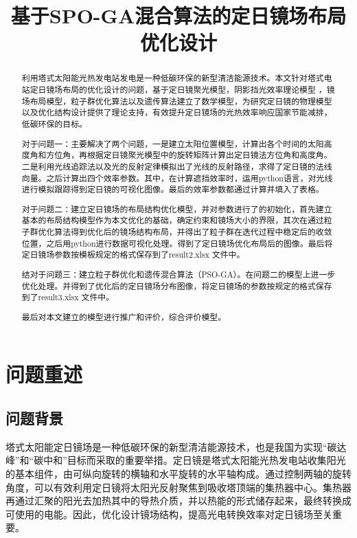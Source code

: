 \documentclass[withoutpreface,bwprint]{cumcmthesis} %
\title{基于SPO-GA混合算法的定日镜场布局优化设计}
\begin{document}
\maketitle

\begin{abstract}
    利用塔式太阳能光热发电站发电是一种低碳环保的新型清洁能源技术。本文针对塔式电站定日镜场布局的优化设计的问题，基于定日镜聚光模型，阴影挡光效率理论模型 ，镜场布局模型，粒子群优化算法以及遗传算法建立了数学模型，为研究定日镜的物理模型以及优化结构设计提供了理论支持，有效提升定日镜场的光热效率响应国家节能减排，低碳环保的目标。

    对于问题一：主要解决了两个问题，一是建立太阳位置模型，计算出各个时间的太阳高度角和方位角，再根据定日镜聚光模型中的旋转矩阵计算出定日镜法方位角和高度角。二是利用光线追踪法以及光的反射定律模拟出了光线的反射路径，求得了定日镜的法线向量。之后计算出四个效率参数。其中，在计算遮挡效率时，运用python语言，对光线进行模拟跟踪得到定日镜的可视化图像。最后的效率参数都通过计算并填入了表格。

    对于问题二：建立定日镜场的布局结构优化模型，并对参数进行了的初始化，首先建立基本的布局结构模型作为本文优化的基础，确定约束和镜场大小的界限，其次在通过粒子群优化算法得到优化后的镜场结构布局，并得出了粒子群在迭代过程中稳定后的收敛位置，之后用python进行数据可视化处理。得到了定日镜场优化布局后的图像。最后将定日镜场参数按模板规定的格式保存到了result2.xlsx 文件中。

    结对于问题三：建立粒子群优化和遗传混合算法（PSO-GA）。在问题二的模型上进一步优化处理。并得到了优化后的定日镜场分布图像，将定日镜场的参数按规定的格式保存到了result3.xlsx 文件中。

    最后对本文建立的模型进行推广和评价，综合评价模型。

\end{abstract}

\section{问题重述}

\subsection{问题背景}

塔式太阳能定日镜场是一种低碳环保的新型清洁能源技术\cite{许利华2020}，也是我国为实现“碳达峰”和“碳中和”目标而采取的重要举措。定日镜是塔式太阳能光热发电站收集阳光的基本组件，由可纵向旋转的横轴和水平旋转的水平轴构成。通过控制两轴的旋转角度，可以有效利用定日镜将太阳光反射聚焦到吸收塔顶端的集热器中心。集热器再通过汇聚的阳光去加热其中的导热介质，并以热能的形式储存起来，最终转换成可使用的电能。因此，优化设计镜场结构，提高光电转换效率对定日镜场至关重要。
\end{document}
